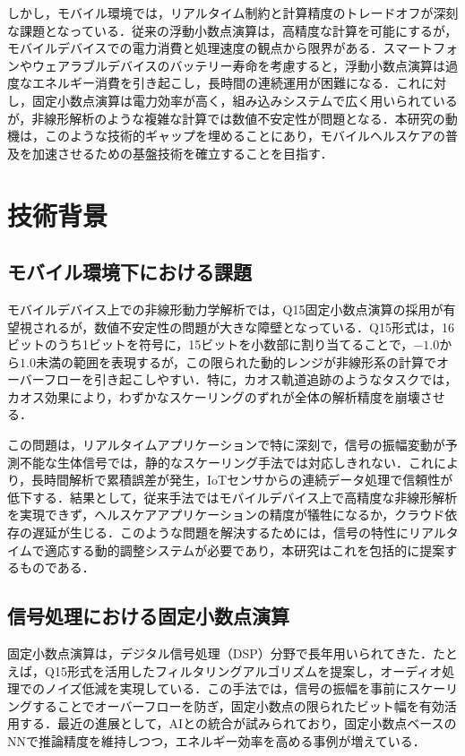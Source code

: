 \documentclass[10pt,journal,compsoc]{IEEEtran}
\begin{document}
しかし，モバイル環境では，リアルタイム制約と計算精度のトレードオフが深刻な課題となっている．従来の浮動小数点演算は，高精度な計算を可能にするが，モバイルデバイスでの電力消費と処理速度の観点から限界がある．スマートフォンやウェアラブルデバイスのバッテリー寿命を考慮すると，浮動小数点演算は過度なエネルギー消費を引き起こし，長時間の連続運用が困難になる．これに対し，固定小数点演算は電力効率が高く，組み込みシステムで広く用いられているが，非線形解析のような複雑な計算では数値不安定性が問題となる．本研究の動機は，このような技術的ギャップを埋めることにあり，モバイルヘルスケアの普及を加速させるための基盤技術を確立することを目指す．

\section{技術背景}

\subsection{モバイル環境下における課題}

モバイルデバイス上での非線形動力学解析では，Q15固定小数点演算の採用が有望視されるが，数値不安定性の問題が大きな障壁となっている．Q15形式は，16ビットのうち1ビットを符号に，15ビットを小数部に割り当てることで，$-1.0$から$1.0$未満の範囲を表現するが，この限られた動的レンジが非線形系の計算でオーバーフローを引き起こしやすい．特に，カオス軌道追跡のようなタスクでは，カオス効果により，わずかなスケーリングのずれが全体の解析精度を崩壊させる．

この問題は，リアルタイムアプリケーションで特に深刻で，信号の振幅変動が予測不能な生体信号では，静的なスケーリング手法では対応しきれない．これにより，長時間解析で累積誤差が発生，IoTセンサからの連続データ処理で信頼性が低下する．結果として，従来手法ではモバイルデバイス上で高精度な非線形解析を実現できず，ヘルスケアアプリケーションの精度が犠牲になるか，クラウド依存の遅延が生じる．このような問題を解決するためには，信号の特性にリアルタイムで適応する動的調整システムが必要であり，本研究はこれを包括的に提案するものである．

\subsection{信号処理における固定小数点演算}

固定小数点演算は，デジタル信号処理（DSP）分野で長年用いられてきた\cite{yates2009fixed,proakis2022digital,buttazzo2011hard}．たとえば，Q15形式を活用したフィルタリングアルゴリズムを提案し，オーディオ処理でのノイズ低減を実現している．この手法では，信号の振幅を事前にスケーリングすることでオーバーフローを防ぎ，固定小数点の限られたビット幅を有効活用する．最近の進展として，AIとの統合が試みられており，固定小数点ベースのNNで推論精度を維持しつつ，エネルギー効率を高める事例が増えている．
\end{document}
